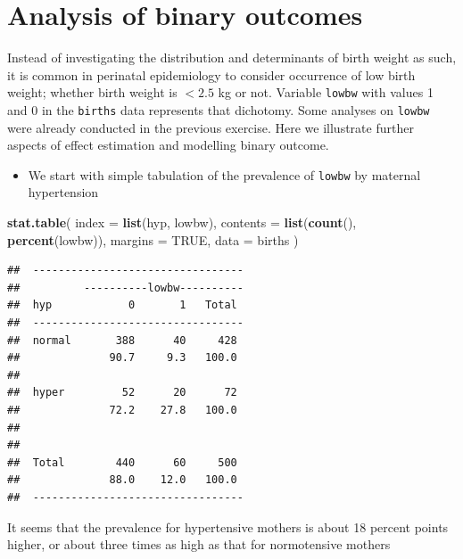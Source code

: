 \documentclass[
]{book}
\newenvironment{Shaded}{\begin{snugshade}}{\end{snugshade}}
\newcommand{\AttributeTok}[1]{\textcolor[rgb]{0.13,0.29,0.53}{#1}}
\newcommand{\ConstantTok}[1]{\textcolor[rgb]{0.56,0.35,0.01}{#1}}
\newcommand{\FunctionTok}[1]{\textcolor[rgb]{0.13,0.29,0.53}{\textbf{#1}}}
\newcommand{\NormalTok}[1]{#1}
\providecommand{\tightlist}{%
  \setlength{\itemsep}{0pt}\setlength{\parskip}{0pt}}
\begin{document}
\section{Analysis of binary outcomes}\label{analysis-of-binary-outcomes}

Instead of investigating the distribution and determinants
of birth weight as such, it is common in perinatal
epidemiology to consider
occurrence of low birth weight; whether birth weight is
\(< 2.5\) kg or not. Variable \texttt{lowbw} with values 1 and 0
in the \texttt{births} data represents that dichotomy.
Some analyses on \texttt{lowbw} were already conducted
in the previous exercise. Here we illustrate further
aspects of effect estimation
and modelling binary outcome.

\begin{itemize}
\tightlist
\item
  We start with simple tabulation
  of the prevalence of \texttt{lowbw} by maternal hypertension
\end{itemize}

\begin{Shaded}
\begin{Highlighting}[]
\FunctionTok{stat.table}\NormalTok{(}
  \AttributeTok{index =} \FunctionTok{list}\NormalTok{(hyp, lowbw),}
  \AttributeTok{contents =} \FunctionTok{list}\NormalTok{(}\FunctionTok{count}\NormalTok{(), }\FunctionTok{percent}\NormalTok{(lowbw)),}
  \AttributeTok{margins =} \ConstantTok{TRUE}\NormalTok{, }\AttributeTok{data =}\NormalTok{ births}
\NormalTok{)}
\end{Highlighting}
\end{Shaded}

\begin{verbatim}
##  --------------------------------- 
##          ----------lowbw---------- 
##  hyp            0       1   Total  
##  --------------------------------- 
##  normal       388      40     428  
##              90.7     9.3   100.0  
##                                    
##  hyper         52      20      72  
##              72.2    27.8   100.0  
##                                    
##                                    
##  Total        440      60     500  
##              88.0    12.0   100.0  
##  ---------------------------------
\end{verbatim}

It seems that the prevalence for hypertensive mothers
is about 18 percent points higher,
or about three times as high as that for normotensive mothers
\end{document}
